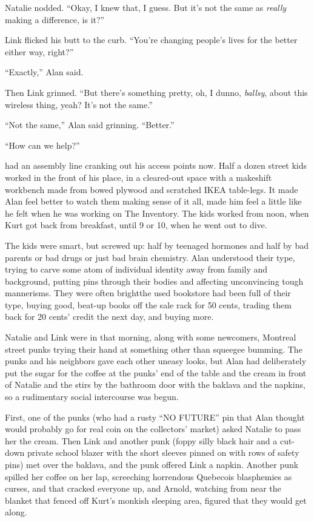 Natalie nodded.  ``Okay, I knew that, I guess.  But it's not the same
as \textit{really} making a difference, is it?''

Link flicked his butt to the curb.  ``You're changing people's lives
for the better either way, right?''

``Exactly,'' Alan said.

Then Link grinned.  ``But there's something pretty, oh, I dunno,
\textit{ballsy}, about this wireless thing, yeah?  It's not the
same.''

``Not the same,'' Alan said grinning.  ``Better.''

``How can we help?''

 had an assembly line cranking out his access points now.  Half a
dozen street kids worked in the front of his place, in a cleared-out
space with a makeshift workbench made from bowed plywood and scratched
IKEA table-legs.  It made Alan feel better to watch them making sense
of it all, made him feel a little like he felt when he was working on
The Inventory.  The kids worked from noon, when Kurt got back from
breakfast, until 9 or 10, when he went out to dive.

The kids were smart, but screwed up:  half by teenaged hormones and
half by bad parents or bad drugs or just bad brain chemistry.  Alan
understood their type, trying to carve some atom of individual
identity away from family and background, putting pins through their
bodies and affecting unconvincing tough mannerisms.  They were often
bright\dash{}the used bookstore had been full of their type, buying good,
beat-up books off the sale rack for 50 cents, trading them back for 20
cents' credit the next day, and buying more.

Natalie and Link were in that morning, along with some newcomers,
Montreal street punks trying their hand at something other than
squeegee bumming.  The punks and his neighbors gave each other uneasy
looks, but Alan had deliberately put the sugar for the coffee at the
punks' end of the table and the cream in front of Natalie and the
stirs by the bathroom door with the baklava and the napkins, so a
rudimentary social intercourse was begun.

First, one of the punks (who had a rusty ``NO FUTURE'' pin that Alan
thought would probably go for real coin on the collectors' market)
asked Natalie to pass her the cream.  Then Link and another punk
(foppy silly black hair and a cut-down private school blazer with the
short sleeves pinned on with rows of safety pins) met over the
baklava, and the punk offered Link a napkin.  Another punk spilled her
coffee on her lap, screeching horrendous Quebecois blasphemies as
curses, and that cracked everyone up, and Arnold, watching from near
the blanket that fenced off Kurt's monkish sleeping area, figured that
they would get along.

